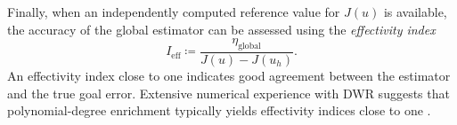 
Finally, when an independently computed reference value for \(J(u)\) is available, the accuracy of the global estimator can be assessed using the \emph{effectivity index}
\begin{equation}
I_{\mathrm{eff}}
\coloneqq
\frac{\eta_{\mathrm{global}}}{J(u)-J(u_h)}.
\label{eq:signed-effectivity}
\end{equation}
An effectivity index close to one indicates good agreement between the estimator and the true goal error. Extensive numerical experience with DWR suggests that polynomial-degree enrichment typically yields effectivity indices close to one \cite{ENDTMAYER202419}.



